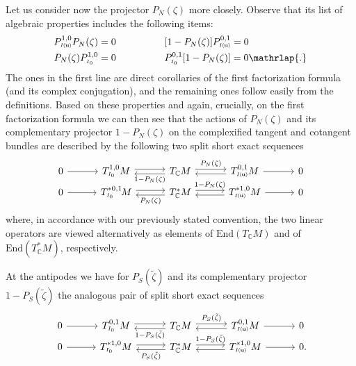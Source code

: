 \documentclass[11pt]{amsart}
\theoremstyle{remark}
\theoremstyle{remark}
\theoremstyle{definition}
\theoremstyle{definition}
\theoremstyle{definition}
\newcommand{\Iu}{\scriptscriptstyle{I\nhp(\nhp\mathbf{u}\hspace{-0.25pt})}} %
\newcommand{\Io}{{\scriptscriptstyle I_0}}
\newcommand{\0}{{\scriptstyle 0'}} %
\newcommand{\1}{{\scriptstyle 1'}}
\newcommand{\npt}{\hspace{-1pt}} %
\newcommand{\nhp}{\hspace{-0.5pt}} %
\begin{document}
Let us consider now the projector $P_N(\zeta)$ more closely. Observe that its list of algebraic properties includes the following items: 
{\allowdisplaybreaks
\begin{equation}
\begin{aligned}
P^{1,0}_{\Iu} P_N(\zeta) & = 0 &\qquad\qquad& [1-P_N(\zeta)] P^{0,1}_{\Iu} = 0 \\[0pt] 
P_N(\zeta) P^{1,0}_{\Io} & = 0 &\qquad\qquad& P^{0,1}_{\Io}[1-P_N(\zeta)] = 0 \mathrlap{.}
\end{aligned}
\end{equation}
}%
The ones in the first line are direct corollaries of the first factorization formula (and its complex conjugation), and the remaining ones follow easily from the definitions. Based on these properties and again, crucially, on the first factorization formula we can then see that  the actions of $P_N(\zeta)$ and its complementary projector \mbox{$1-P_N(\zeta)$} on the complexified tangent and cotangent bundles are described by the following two split short exact sequences 
\begin{equation*}
\begin{tikzcd}[column sep=3em]
0 \rar & T^{1,0}_{\Io}M \rar[shift left] \rar[shift right, leftarrow, "1-P_N(\zeta)"'] & T_{\mathbb{C}}M \rar[shift left, "P_N(\zeta)"] \rar[shift right, leftarrow] & T^{0,1}_{\Iu}M \rar & 0 \\[-16pt]
0 \rar & T^{*0,1}_{\Io}\npt M \rar[shift left] \rar[shift right, leftarrow, "P_N(\zeta)"'] & T^*_{\mathbb{C}}M \rar[shift left, "1-P_N(\zeta)"] \rar[shift right, leftarrow] & T^{*1,0}_{\Iu}M \rar & 0 
\end{tikzcd}
\end{equation*}
where, in accordance with our previously stated convention, the two linear operators are viewed alternatively as elements of
$\text{End}(T_{\mathbb{C}}M)$ and of $\text{End}(T^*_{\mathbb{C}}M)$, respectively. 

At the antipodes we have for $P_S(\tilde{\zeta})$ and its complementary projector \mbox{$1-P_S(\tilde{\zeta})$} the analogous pair of split short exact sequences
\begin{equation*}
\begin{tikzcd}[column sep=3em]
0 \rar & T^{0,1}_{\Io}M \rar[shift left] \rar[shift right, leftarrow, "1-P_S(\tilde{\zeta})"'] & T_{\mathbb{C}}M \rar[shift left, "P_S(\tilde{\zeta})"] \rar[shift right, leftarrow] & T^{0,1}_{\Iu}M \rar & 0 \\[-16pt]
0 \rar & T^{*1,0}_{\Io}M \rar[shift left] \rar[shift right, leftarrow, "P_S(\tilde{\zeta})"'] & T^*_{\mathbb{C}}M \rar[shift left, "1-P_S(\tilde{\zeta})"] \rar[shift right, leftarrow] & T^{*1,0}_{\Iu}M \rar & 0 \mathrlap{.}
\end{tikzcd}
\end{equation*}
\end{document}
